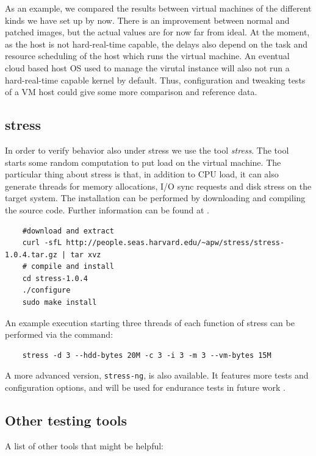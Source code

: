 \documentclass[]{scrartcl}
\begin{document}
As an example, we compared the results between virtual machines of the different kinds we have set up by now. There is an improvement between normal and patched images, but the actual values are for now far from ideal. 
At the moment, as the host is not hard-real-time capable, the delays also depend on the task and resource scheduling of the host which runs the virtual machine.
An eventual cloud based host OS used to manage the virutal instance will also not run a hard-real-time capable kernel by default. Thus, configuration and tweaking tests of a VM host could give some more comparison and reference data.

\subsection{stress}

In order to verify behavior also under stress we use the tool \textit{stress}. The tool starts some random computation to put load on the virtual machine.
The particular thing about stress is that, in addition to CPU load, it can also generate threads for memory allocations, I/O sync requests and disk stress on the target system.
The installation can be performed by downloading and compiling the source code. Further information can be found at \cite{stress01}.

\begin{verbatim}
	#download and extract
	curl -sfL http://people.seas.harvard.edu/~apw/stress/stress-1.0.4.tar.gz | tar xvz
	# compile and install
	cd stress-1.0.4
	./configure
	sudo make install
\end{verbatim}

An example execution starting three threads of each function of stress can be performed via the command:

\begin{verbatim}
	stress -d 3 --hdd-bytes 20M -c 3 -i 3 -m 3 --vm-bytes 15M
\end{verbatim}

A more advanced version, \texttt{stress-ng}, is also available. It features more tests and configuration options, and will be used for endurance tests in future work \cite{stress02}.

\subsection{Other testing tools}

A list of other tools that might be helpful:
\end{document}
